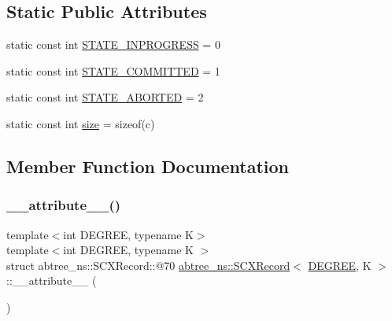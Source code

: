 \subsection*{Static Public Attributes}
\begin{DoxyCompactItemize}
\item 
static const int \hyperlink{structabtree__ns_1_1SCXRecord_a23c9d7401344db0f79a0f504d483b816}{S\+T\+A\+T\+E\+\_\+\+I\+N\+P\+R\+O\+G\+R\+E\+SS} = 0
\item 
static const int \hyperlink{structabtree__ns_1_1SCXRecord_acacd3de85ca93c1a139153163fe9d908}{S\+T\+A\+T\+E\+\_\+\+C\+O\+M\+M\+I\+T\+T\+ED} = 1
\item 
static const int \hyperlink{structabtree__ns_1_1SCXRecord_a853e35695f909947c9a0015f1d801cad}{S\+T\+A\+T\+E\+\_\+\+A\+B\+O\+R\+T\+ED} = 2
\item 
static const int \hyperlink{structabtree__ns_1_1SCXRecord_afbda1dbb6ba9982a911014053e34362f}{size} = sizeof(c)
\end{DoxyCompactItemize}


\subsection{Member Function Documentation}
\mbox{\label{structabtree__ns_1_1SCXRecord_a42549d20c90adbf96ebd6bcc83837fd0}} 
\subsubsection{\texorpdfstring{\+\_\+\+\_\+attribute\+\_\+\+\_\+()}{\_\_attribute\_\_()}}
{\footnotesize\ttfamily template$<$int D\+E\+G\+R\+EE, typename K$>$ \\
template$<$int D\+E\+G\+R\+EE, typename K $>$ \\
struct abtree\+\_\+ns\+::\+S\+C\+X\+Record\+::@70 \hyperlink{structabtree__ns_1_1SCXRecord}{abtree\+\_\+ns\+::\+S\+C\+X\+Record}$<$ \hyperlink{brown__sigouin__abtree__kcas_2adapter_8h_a5d88b17d70c985f2f2b8e987037fd6dd}{D\+E\+G\+R\+EE}, K $>$\+::\+\_\+\+\_\+attribute\+\_\+\+\_\+ (\begin{DoxyParamCaption}\item[{(packed)}]{ }\end{DoxyParamCaption})}



